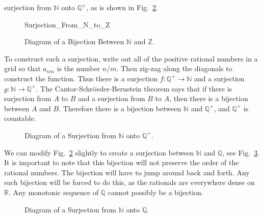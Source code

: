 \documentclass[crop=false,class=book,oneside]{standalone}
\begin{document}
            surjection from $\mathbb{N}$ onto $\mathbb{Q}^{+}$, as is
            shown in
            Fig.~\ref{fig:MEASURE_THEORY:BIJECTION_N_AND_Q_Plus}.
            \newpage
            \begin{figure}[H]
                \centering
                \captionsetup{type=figure}
                {Surjection_From_N_to_Z}
                \caption{Diagram of a Bijection Between
                         $\mathbb{N}$ and $\mathbb{Z}$.}
                \label{fig:MEASURE_THEORY:BIJECTION_N_AND_Z}
            \end{figure}
            To construct such a surjection, write out all of the
            positive rational numbers in a grid so that $a_{nm}$ is
            the number $n/m$. Then zig-zag along the diagonals
            to construct the function. Thus there is a surjection
            $f:\mathbb{Q}^{+}\rightarrow\mathbb{N}$
            and a surjection $g:\mathbb{N}\rightarrow\mathbb{Q}^{+}$. The
            Cantor-Schr\"{o}eder-Bernstein theorem says that if there
            is surjection from $A$ to $B$ and a surjection from $B$
            to $A$, then there is a bijection between $A$ and $B$.
            Therefore there is a bijection between $\mathbb{N}$ and
            $\mathbb{Q}^{+}$, and $\mathbb{Q}^{+}$ is countable.
            \begin{figure}[H]
                \centering
                \captionsetup{type=figure}
                \caption{Diagram of a Surjection from
                         $\mathbb{N}$ onto $\mathbb{Q}^{+}$.}
                \label{fig:MEASURE_THEORY:BIJECTION_N_AND_Q_Plus}
            \end{figure}
            We can modify
            Fig.~\ref{fig:MEASURE_THEORY:BIJECTION_N_AND_Q_Plus}
            slightly to create a surjection between $\mathbb{N}$ and
            $\mathbb{Q}$, see
            Fig.~\ref{fig:MEASURE_THEORY:BIJECTION_N_AND_Q}.
            It is important to note that this bijection will not
            preserve the order of the rational numbers. The bijection
            will have to jump around back and forth. Any such
            bijection will be forced to do this, as the rationals are
            everywhere dense on $\mathbb{R}$. Any monotonic sequence of
            $\mathbb{Q}$ cannot possibly be a bijection.
            \begin{figure}[H]
                \centering
                \captionsetup{type=figure}
                \caption{Diagram of a Surjection from
                         $\mathbb{N}$ onto $\mathbb{Q}$.}
                \label{fig:MEASURE_THEORY:BIJECTION_N_AND_Q}
            \end{figure}
\end{document}
